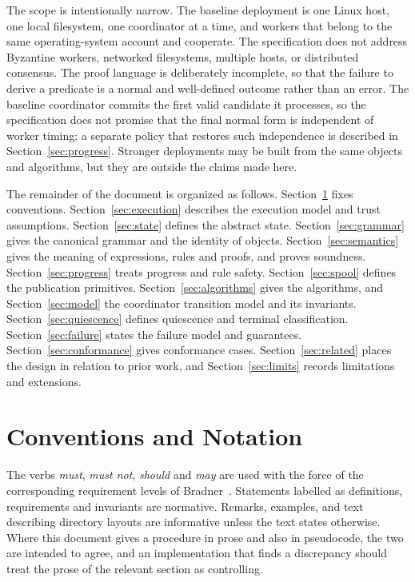 \documentclass[11pt,a4paper]{article}
\theoremstyle{plain}
\theoremstyle{definition}
\theoremstyle{remark}
\theoremstyle{definition}
\begin{document}
The scope is intentionally narrow. The baseline deployment is one Linux host, one local filesystem, one coordinator at a time, and workers that belong to the same operating-system account and cooperate. The specification does not address Byzantine workers, networked filesystems, multiple hosts, or distributed consensus. The proof language is deliberately incomplete, so that the failure to derive a predicate is a normal and well-defined outcome rather than an error. The baseline coordinator commits the first valid candidate it processes, so the specification does not promise that the final normal form is independent of worker timing; a separate policy that restores such independence is described in Section~\ref{sec:progress}. Stronger deployments may be built from the same objects and algorithms, but they are outside the claims made here.

The remainder of the document is organized as follows. Section~\ref{sec:conventions} fixes conventions. Section~\ref{sec:execution} describes the execution model and trust assumptions. Section~\ref{sec:state} defines the abstract state. Section~\ref{sec:grammar} gives the canonical grammar and the identity of objects. Section~\ref{sec:semantics} gives the meaning of expressions, rules and proofs, and proves soundness. Section~\ref{sec:progress} treats progress and rule safety. Section~\ref{sec:spool} defines the publication primitives. Section~\ref{sec:algorithms} gives the algorithms, and Section~\ref{sec:model} the coordinator transition model and its invariants. Section~\ref{sec:quiescence} defines quiescence and terminal classification. Section~\ref{sec:failure} states the failure model and guarantees. Section~\ref{sec:conformance} gives conformance cases. Section~\ref{sec:related} places the design in relation to prior work, and Section~\ref{sec:limits} records limitations and extensions.

\section{Conventions and Notation}
\label{sec:conventions}

The verbs \emph{must}, \emph{must not}, \emph{should} and \emph{may} are used with the force of the corresponding requirement levels of Bradner~\cite{bradner1997}. Statements labelled as definitions, requirements and invariants are normative. Remarks, examples, and text describing directory layouts are informative unless the text states otherwise. Where this document gives a procedure in prose and also in pseudocode, the two are intended to agree, and an implementation that finds a discrepancy should treat the prose of the relevant section as controlling.
\end{document}
